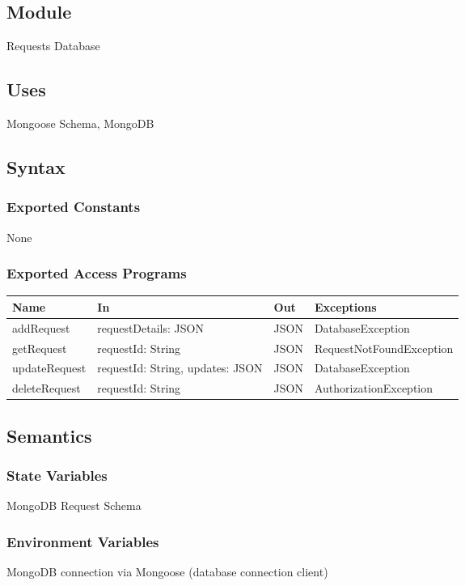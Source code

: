 \documentclass[12pt, titlepage]{article}
\begin{document}
\subsection{Module}
Requests Database

\subsection{Uses}
Mongoose Schema, MongoDB

\subsection{Syntax}

\subsubsection{Exported Constants}
None

\subsubsection{Exported Access Programs}

\begin{center}
\begin{tabular}{p{4cm} p{4cm} p{2cm} p{4cm}}
\hline
\textbf{Name} & \textbf{In} & \textbf{Out} & \textbf{Exceptions} \\
\hline
addRequest & requestDetails: JSON & JSON & DatabaseException \\
getRequest & requestId: String & JSON & RequestNotFoundException \\
updateRequest & requestId: String, updates: JSON & JSON & DatabaseException \\
deleteRequest & requestId: String & JSON & AuthorizationException \\
\hline
\end{tabular}
\end{center}

\subsection{Semantics}

\subsubsection{State Variables}
MongoDB Request Schema

\subsubsection{Environment Variables}
MongoDB connection via Mongoose (database connection client)
\end{document}
